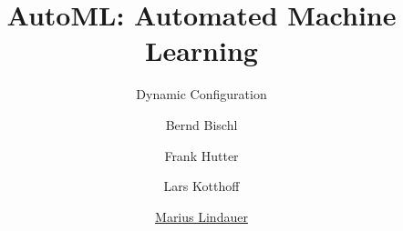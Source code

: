 




\title[AutoML: Learning to Control]{AutoML: Automated Machine Learning}
\subtitle{Dynamic Configuration}
\author[Marius Lindauer]{Bernd Bischl \and Frank Hutter \and Lars Kotthoff \and \underline{Marius Lindauer}}
\institute{}
\date{}





	
	\maketitle
	

